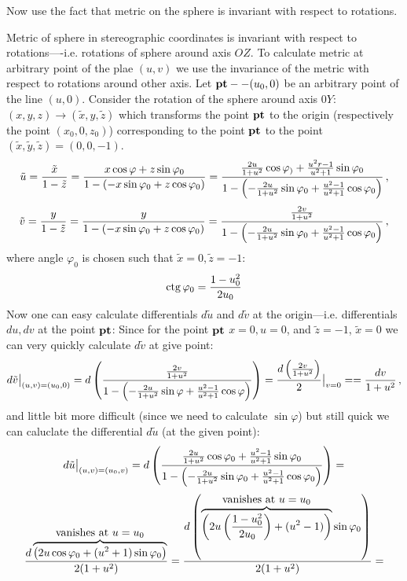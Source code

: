 Now use the fact that metric on the sphere is invariant with respect to 
rotations.

   Metric of sphere in stereographic coordinates is invariant
with respect to rotations----i.e. rotations of sphere around
axis $OZ$. To calculate metric at arbitrary point of the plae $(u,v)$
we use the invariance of the metric with respect to rotations around
other axis.
 Let ${\bf pt}--(u_0,0)$ be an arbitrary point of the line $(u,0)$.
Consider the rotation of the sphere around axis $0Y$:
                   $(x,y,z)\to (\tilde x,y,\tilde z)$ 
which transforms the point ${\bf pt}$ to the origin
(respectively the point $(x_0,0,z_0)$) corresponding to the point ${\bf pt}$
to the point $(\tilde x,\tilde y,\tilde z)=(0,0,-1)$.
                    $$
   \tilde u={\tilde x\over 1-\tilde z}=
 {x\cos\varphi+z\sin \varphi_0\over 1-(-x\sin\varphi_0+z\cos\varphi_0)}=
 {{2u\over 1+u^2}\cos\varphi_)+{u^2r-1\over u^2+1}\sin \varphi_0
         \over 
   1-\left(-{2u\over 1+u^2}\sin\varphi_0+{u^2-1\over u^2+1}
        \cos\varphi_0\right)}\,,
                    $$
                    $$
   \tilde v={ y\over 1-\tilde z}=
 {y\over 1-(-x\sin\varphi_0+z\cos\varphi_0)}=
 {{2v\over 1+u^2}
         \over 
   1-\left(-{2u\over 1+u^2}\sin\varphi_0+{u^2-1\over u^2+1}
\cos\varphi_0\right)}\,,
                    $$
where angle $\varphi_0$ is chosen such that 
$\tilde x=0, \tilde z=-1$:
              $$
   {\rm ctg\,}\varphi_0={1-u_0^2\over 2u_0}
              $$
Now one can easy  calculate  differentials $d\tilde u$ and $d\tilde v$
at the origin---i.e. differentials $du,dv$ at the point ${\bf pt}$:
Since for the point ${\bf pt}$ $x=0, u=0$, and $\tilde z=-1$, $\tilde x=0$
we can very quickly calculate $d\tilde v$ at give point:          
             $$
d\tilde v\big\vert_{(u,v)=(u_0,0)}=
      d\left(
           {{2v\over 1+u^2}
         \over 
   1-\left(
   -{2u\over 1+u^2}\sin\varphi+{u^2-1\over u^2+1}\cos\varphi
\right)}
\right)=
          {d\left({2v\over 1+u^2}\right)\over 2}\big\vert_{v=0}=
              ={d v\over 1+u^2}\,,
                     $$
and little bit more  difficult (since we need to calculate 
   $\sin \varphi$)
  but still quick we can caluclate the differential 
   $d\tilde u$ (at the given point):
   $$ 
d\tilde u\big\vert_{(u,v)=(u_0,v)}=d\left( 
 {{2u\over 1+u^2}\cos\varphi_0+{u^2-1\over u^2+1}\sin \varphi_0
         \over 
   1-\left(-{2u\over 1+u^2}\sin\varphi_0+{u^2-1\over u^2+1}\cos\varphi_0
\right)}
\right)=
                       $$
                       $$
                          {
          d\overbrace{\left(
    2u\cos\varphi_0+(u^2+1)\sin \varphi_0
\right)}^{\hbox{vanishes at $u=u_0$}}
                  \over 2(1+u^2)
                  }=
                     {
          d\left(\overbrace{\left(
    2u\left({1-u_0^2\over 2u_0}\right)+(u^2-1)
\right)}^{\hbox{vanishes at $u=u_0$}}\sin\varphi_0\right)
                      \over 2(1+u^2)
                    }=
                   $$
